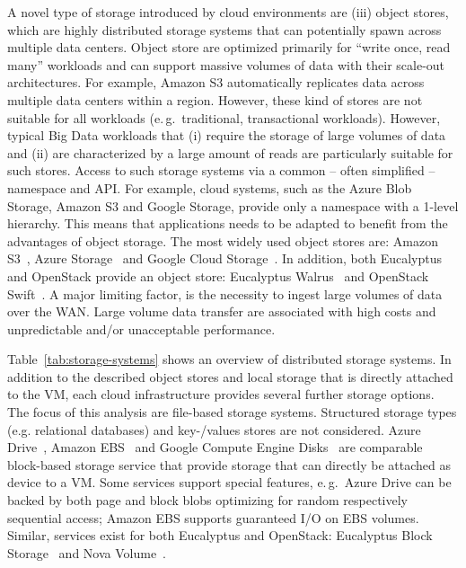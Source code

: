 \documentclass[times]{cpeauth}
\begin{document}
A novel type of storage introduced by cloud environments are (iii) object
stores, which are highly distributed storage systems that can potentially
spawn across multiple data centers. Object store are optimized primarily for
``write once, read many'' workloads and can support massive volumes of data
with their scale-out architectures. For example, Amazon S3 automatically
replicates data across multiple data centers within a region. However, these
kind of stores are not suitable for all workloads (e.\,g.\ traditional,
transactional workloads). However, typical Big Data workloads that (i) require
the storage of large volumes of data and (ii) are characterized by a large
amount of reads are particularly suitable for such stores. Access to such
storage systems via a common -- often simplified -- namespace and API. For
example, cloud systems, such as the Azure Blob Storage, Amazon S3 and Google
Storage, provide only a namespace with a 1-level hierarchy. This means that
applications needs to be adapted to benefit from the advantages of object
storage. The most widely used object stores are: Amazon S3~\cite{amazons3},
Azure Storage~\cite{azure-blob-storage} and Google Cloud
Storage~\cite{google-storage}. In addition, both Eucalyptus and OpenStack
provide an object store: Eucalyptus Walrus~\cite{walrus} and OpenStack
Swift~\cite{openstack-swift}. A major limiting factor, is the necessity to
ingest large volumes of data over the WAN. Large volume data transfer are
associated with high costs and unpredictable and/or unacceptable performance.

Table~\ref{tab:storage-systems} shows an overview of distributed storage
systems. In addition to the described object stores and local storage that is
directly attached to the VM, each cloud infrastructure provides several
further storage options. The focus of this analysis are file-based storage
systems. Structured storage types (e.g. relational databases) and key-/values
stores are not considered. Azure Drive~\cite{azure-drive}, Amazon
EBS~\cite{baron2010} and Google Compute Engine Disks~\cite{gce_disks} are
comparable block-based storage service that provide storage that can directly
be attached as device to a VM. Some services support special features, e.\,g.\
Azure Drive can be backed by both page and block blobs optimizing for random
respectively sequential access; Amazon EBS supports guaranteed I/O on EBS
volumes. Similar, services exist for both Eucalyptus and OpenStack: Eucalyptus
Block Storage~\cite{euca-block} and Nova Volume~\cite{nova-volume}.
\end{document}
